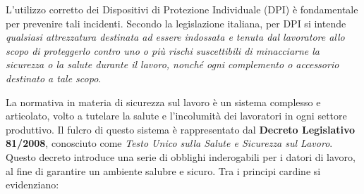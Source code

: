  
\noindent L'utilizzo corretto dei Dispositivi di Protezione Individuale (DPI) è fondamentale per prevenire tali incidenti. Secondo la legislazione italiana, per DPI si intende \emph{qualsiasi attrezzatura destinata ad essere indossata e tenuta dal lavoratore allo scopo di proteggerlo contro uno o più rischi suscettibili di minacciarne la sicurezza o la salute durante il lavoro, nonché ogni complemento o accessorio destinato a tale scopo}\cite{b3decreto81}.

\medskip

\noindent La normativa in materia di sicurezza sul lavoro è un sistema complesso e articolato, volto a tutelare la salute e l'incolumità dei lavoratori in ogni settore produttivo. Il fulcro di questo sistema è rappresentato dal \textbf{Decreto Legislativo 81/2008}, conosciuto come \emph{Testo Unico sulla Salute e Sicurezza sul Lavoro}. Questo decreto introduce una serie di obblighi inderogabili per i datori di lavoro, al fine di garantire un ambiente salubre e sicuro. Tra i principi cardine si evidenziano:

